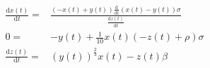 \begin{align}
\frac{\mathrm{d} x\left( t \right)}{\mathrm{d}t} =& \frac{\left(  - x\left( t \right) + y\left( t \right) \right) \frac{\mathrm{d}}{\mathrm{d}t} \left( x\left( t \right) - y\left( t \right) \right) \sigma}{\frac{\mathrm{d} z\left( t \right)}{\mathrm{d}t}} \\
0 =&  - y\left( t \right) + \frac{1}{10} x\left( t \right) \left(  - z\left( t \right) + \rho \right) \sigma \\
\frac{\mathrm{d} z\left( t \right)}{\mathrm{d}t} =& \left( y\left( t \right) \right)^{\frac{2}{3}} x\left( t \right) - z\left( t \right) \beta
\end{align}
